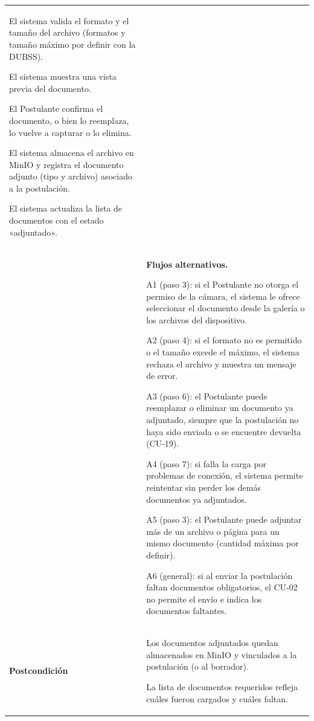 \begin{longtable}{>{\raggedright\arraybackslash}p{2.9cm} >{\raggedright\arraybackslash}p{12.6cm}}
\begin{cupasos}
    \item El sistema valida el formato y el tamaño del archivo (formatos y tamaño máximo por definir con la DUBSS).
    \item El sistema muestra una vista previa del documento.
    \item El Postulante confirma el documento, o bien lo reemplaza, lo vuelve a capturar o lo elimina.
    \item El sistema almacena el archivo en MinIO y registra el documento adjunto (tipo y archivo) asociado a la postulación.
    \item El sistema actualiza la lista de documentos con el estado «adjuntado».
\end{cupasos} \\
 & \textbf{Flujos alternativos.}
\begin{cuvin}
    \item A1 (paso 3): si el Postulante no otorga el permiso de la cámara, el sistema le ofrece seleccionar el documento desde la galería o los archivos del dispositivo.
    \item A2 (paso 4): si el formato no es permitido o el tamaño excede el máximo, el sistema rechaza el archivo y muestra un mensaje de error.
    \item A3 (paso 6): el Postulante puede reemplazar o eliminar un documento ya adjuntado, siempre que la postulación no haya sido enviada o se encuentre devuelta (CU-19).
    \item A4 (paso 7): si falla la carga por problemas de conexión, el sistema permite reintentar sin perder los demás documentos ya adjuntados.
    \item A5 (paso 3): el Postulante puede adjuntar más de un archivo o página para un mismo documento (cantidad máxima por definir).
    \item A6 (general): si al enviar la postulación faltan documentos obligatorios, el CU-02 no permite el envío e indica los documentos faltantes.
\end{cuvin} \\
\midrule
\textbf{Postcondición} & \vspace{-\baselineskip}\begin{cuvin}
    \item Los documentos adjuntados quedan almacenados en MinIO y vinculados a la postulación (o al borrador).
    \item La lista de documentos requeridos refleja cuáles fueron cargados y cuáles faltan.
\end{cuvin} \\

\end{longtable}
